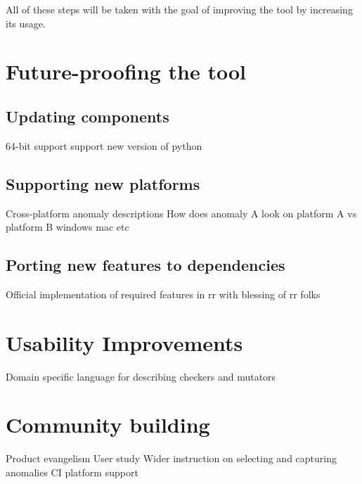 \documentclass{article}
\begin{document}
All of these steps will be taken with the goal of improving the tool by
increasing its usage.

\section{Future-proofing the tool}

\subsection{Updating components}
64-bit support
support new version of python

\subsection{Supporting new platforms}
Cross-platform anomaly descriptions
  How does anomaly A look on platform A vs platform B
windows mac etc

\subsection{Porting new features to dependencies}
Official implementation of required features in rr with blessing of rr folks

\section{Usability Improvements}
  Domain specific language for describing checkers and mutators


\section{Community building}
  Product evangelism
  User study
  Wider instruction on selecting and capturing anomalies
  CI platform support
\end{document}
